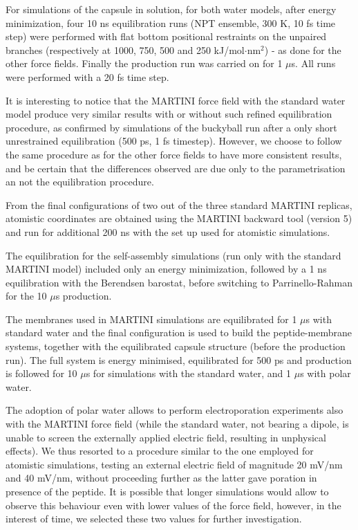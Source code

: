 For simulations of the capsule in solution, for both water models, after energy minimization, four 10 ns equilibration runs (NPT ensemble, 300 K, 10 fs time step) were performed with flat bottom positional restraints on the unpaired branches (respectively at 1000, 750, 500 and 250 kJ/mol$\cdot$nm$^2$) - as done for the other force fields.
%
Finally the production run was carried on for 1 $\mu$s. All runs were performed with a 20 fs time step.

It is interesting to notice that the MARTINI force field with the standard water model produce very similar results with or without such refined equilibration procedure, as confirmed by simulations of the buckyball run after a only short unrestrained equilibration (500 ps, 1 fs timestep). However, we choose to follow the same procedure as for the other force fields to have more consistent results, and be certain that the differences observed are due only to the parametrisation an not the equilibration procedure.

From the final configurations of two out of the three standard MARTINI replicas, atomistic coordinates are obtained using the MARTINI backward tool (version 5) \citep{Wassenaar2014} and run for additional 200 ns with the set up used for atomistic simulations.

The equilibration for the self-assembly simulations (run only with the standard MARTINI model) included only an energy minimization, followed by a 1 ns equilibration with the Berendsen barostat, before switching to Parrinello-Rahman for the 10 $\mu$s production.

The membranes used in MARTINI simulations are equilibrated for 1 $\mu$s with standard water and the final configuration is used to build the peptide-membrane systems, together with the equilibrated capsule structure (before the production run). The full system is energy minimised, equilibrated for 500 ps and production is followed for 10 $\mu$s for simulations with the standard water, and 1 $\mu$s with polar water.

The adoption of polar water allows to perform electroporation experiments also with the MARTINI force field (while the standard water, not bearing a dipole, is unable to screen the externally applied electric field, resulting in unphysical effects).
%
We thus resorted to a procedure similar to the one employed for atomistic simulations, testing an external electric field of magnitude 20 mV/nm and 40 mV/nm, without proceeding further as the latter gave poration in presence of the peptide.
%
It is possible that longer simulations would allow to observe this behaviour even with lower values of the force field, however, in the interest of time, we selected these two values for further investigation.

